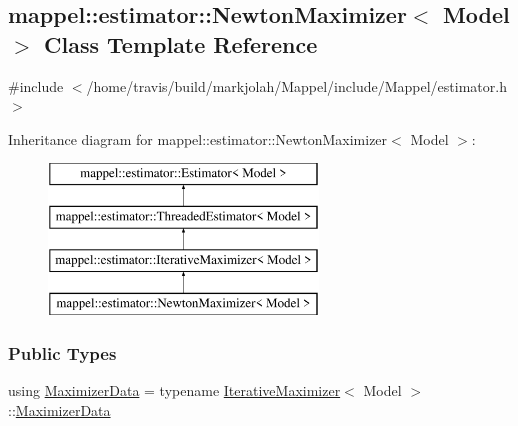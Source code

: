 \hypertarget{classmappel_1_1estimator_1_1NewtonMaximizer}{}\subsection{mappel\+:\+:estimator\+:\+:Newton\+Maximizer$<$ Model $>$ Class Template Reference}
\label{classmappel_1_1estimator_1_1NewtonMaximizer}


{\ttfamily \#include $<$/home/travis/build/markjolah/\+Mappel/include/\+Mappel/estimator.\+h$>$}

Inheritance diagram for mappel\+:\+:estimator\+:\+:Newton\+Maximizer$<$ Model $>$\+:\begin{figure}[H]
\begin{center}
\leavevmode
\includegraphics[height=4.000000cm]{classmappel_1_1estimator_1_1NewtonMaximizer}
\end{center}
\end{figure}
\subsubsection*{Public Types}
\begin{DoxyCompactItemize}
\item 
using \hyperlink{classmappel_1_1estimator_1_1NewtonMaximizer_a0389811392d2d22092f57936cef8a628}{Maximizer\+Data} = typename \hyperlink{classmappel_1_1estimator_1_1IterativeMaximizer}{Iterative\+Maximizer}$<$ Model $>$\+::\hyperlink{classmappel_1_1estimator_1_1NewtonMaximizer_a0389811392d2d22092f57936cef8a628}{Maximizer\+Data}
\end{DoxyCompactItemize}
